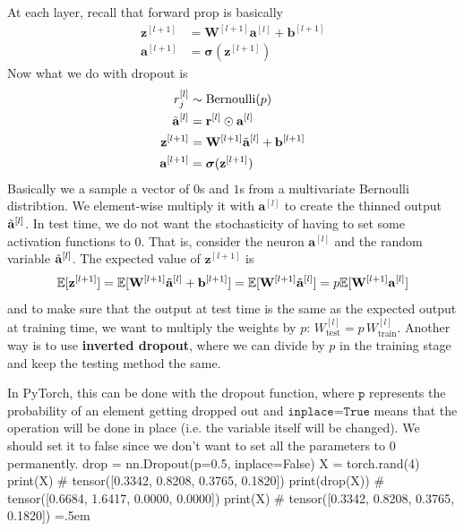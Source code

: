 \documentclass{article}
\newenvironment{cverbatim}
    {\SaveVerbatim{cverb}}
    {\endSaveVerbatim
      \flushleft\fboxrule=0pt\fboxsep=.5em
      \colorbox{cverbbg}{%
        \makebox[\dimexpr\linewidth-2\fboxsep][l]{\BUseVerbatim{cverb}}%
      }
      \endflushleft
  }
\theoremstyle{definition}
\theoremstyle{remark}
\theoremstyle{definition}
\begin{document}
    At each layer, recall that forward prop is basically 
    \begin{align*}
        \mathbf{z}^{[l+1]} & = \mathbf{W}^{[l+1]} \mathbf{a}^{[l]} + \mathbf{b}^{[l+1]} \\
        \mathbf{a}^{[l+1]} & = \boldsymbol{\sigma} (\mathbf{z}^{[l+1]}) 
    \end{align*}
    Now what we do with dropout is 
    \begin{align*}
        r_j^{[l]} & \sim \mathrm{Bernoulli}(p) \\
        \Tilde{\mathbf{a}}^{[l]} & = \mathbf{r}^{[l]} \odot \mathbf{a}^{[l]} \\
        \mathbf{z}^{[l+1]} & = \mathbf{W}^{[l+1]} \Tilde{\mathbf{a}}^{[l]} + \mathbf{b}^{[l+1]} \\
        \mathbf{a}^{[l+1]} & = \boldsymbol{\sigma} (\mathbf{z}^{[l+1]}) 
    \end{align*}
    Basically we a sample a vector of $0$s and $1$s from a multivariate Bernoulli distribtion. We element-wise multiply it with $\mathbf{a}^{[l]}$ to create the thinned output $\Tilde{\mathbf{a}}^{[l]}$. In test time, we do not want the stochasticity of having to set some activation functions to $0$. That is, consider the neuron $\mathbf{a}^{[l]}$ and the random variable $\Tilde{\mathbf{a}}^{[l]}$. The expected value of $\mathbf{z}^{[l+1]}$ is 
    \[\mathbb{E}[\mathbf{z}^{[l+1]}] = \mathbb{E}[ \mathbf{W}^{[l+1]} \Tilde{\mathbf{a}}^{[l]} + \mathbf{b}^{[l+1]}] = \mathbb{E}[ \mathbf{W}^{[l+1]} \Tilde{\mathbf{a}}^{[l]}] = p \mathbb{E}[\mathbf{W}^{[l+1]} \mathbf{a}^{[l]}] \]
    and to make sure that the output at test time is the same as the expected output at training time, we want to multiply the weights by $p$: $W^{[l]}_{\text{test}} = p \, W^{[l]}_{\text{train}}$. Another way is to use \textbf{inverted dropout}, where we can divide by $p$ in the training stage and keep the testing method the same. 

    In PyTorch, this can be done with the dropout function, where $\texttt{p}$ represents the probability of an element getting dropped out and $\texttt{inplace=True}$ means that the operation will be done in place (i.e. the variable itself will be changed). We should set it to false since we don't want to set all the parameters to $0$ permanently. 
    \begin{cverbatim}
    drop = nn.Dropout(p=0.5, inplace=False)
    X = torch.rand(4) 
    print(X)            # tensor([0.3342, 0.8208, 0.3765, 0.1820])
    print(drop(X))      # tensor([0.6684, 1.6417, 0.0000, 0.0000])
    print(X)            # tensor([0.3342, 0.8208, 0.3765, 0.1820])
    \end{cverbatim}
\end{document}
